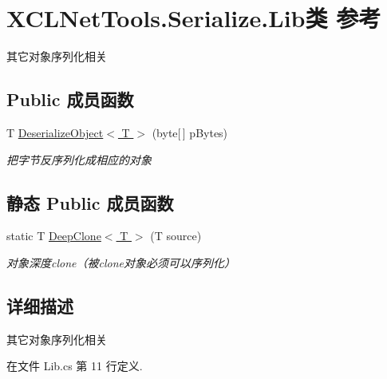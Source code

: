 \hypertarget{class_x_c_l_net_tools_1_1_serialize_1_1_lib}{\section{X\-C\-L\-Net\-Tools.\-Serialize.\-Lib类 参考}
\label{class_x_c_l_net_tools_1_1_serialize_1_1_lib}
}


其它对象序列化相关  


\subsection*{Public 成员函数}
\begin{DoxyCompactItemize}
\item 
T \hyperlink{class_x_c_l_net_tools_1_1_serialize_1_1_lib_ae2d400cea76a1f11f5141deab7c6d2b1}{Deserialize\-Object$<$ T $>$} (byte\mbox{[}$\,$\mbox{]} p\-Bytes)
\begin{DoxyCompactList}\small\item\em 把字节反序列化成相应的对象 \end{DoxyCompactList}\end{DoxyCompactItemize}
\subsection*{静态 Public 成员函数}
\begin{DoxyCompactItemize}
\item 
static T \hyperlink{class_x_c_l_net_tools_1_1_serialize_1_1_lib_ad38f60aaa57643027af6ebc86ef7fe18}{Deep\-Clone$<$ T $>$} (T source)
\begin{DoxyCompactList}\small\item\em 对象深度clone（被clone对象必须可以序列化） \end{DoxyCompactList}\end{DoxyCompactItemize}


\subsection{详细描述}
其它对象序列化相关 



在文件 Lib.\-cs 第 11 行定义.



